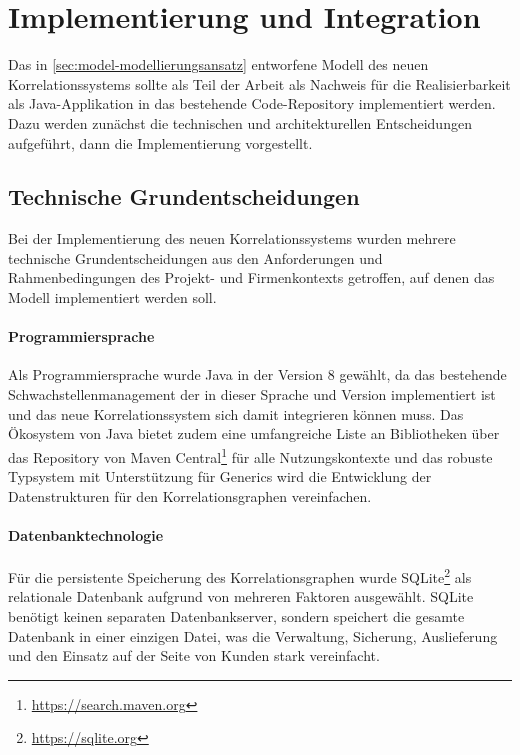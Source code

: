 \section{Implementierung und Integration}\label{sec:implementierung}

Das in \autoref{sec:model-modellierungsansatz} entworfene Modell des neuen Korrelationssystems sollte als Teil der Arbeit als Nachweis für die Realisierbarkeit als Java-Applikation in das bestehende Code-Repository implementiert werden.
Dazu werden zunächst die technischen und architekturellen Entscheidungen aufgeführt, dann die Implementierung vorgestellt.

\subsection{Technische Grundentscheidungen}\label{subsec:impl-tech-choices}

Bei der Implementierung des neuen Korrelationssystems wurden mehrere technische Grundentscheidungen aus den Anforderungen und Rahmenbedingungen des Projekt- und Firmenkontexts getroffen, auf denen das Modell implementiert werden soll.

\paragraph{Programmiersprache}

Als Programmiersprache wurde Java in der Version 8 gewählt, da das bestehende Schwachstellenmanagement der \metaeffektsp in dieser Sprache und Version implementiert ist und das neue Korrelationssystem sich damit integrieren können muss.
Das Ökosystem von Java bietet zudem eine umfangreiche Liste an Bibliotheken über das Repository von Maven Central\footnote{\url{https://search.maven.org}} für alle Nutzungskontexte und das robuste Typsystem mit Unterstützung für Generics wird die Entwicklung der Datenstrukturen für den Korrelationsgraphen vereinfachen.

\paragraph{Datenbanktechnologie}

Für die persistente Speicherung des Korrelationsgraphen wurde SQLite\footnote{\url{https://sqlite.org}} als relationale Datenbank aufgrund von mehreren Faktoren ausgewählt.
SQLite benötigt keinen separaten Datenbankserver, sondern speichert die gesamte Datenbank in einer einzigen Datei, was die Verwaltung, Sicherung, Auslieferung und den Einsatz auf der Seite von Kunden stark vereinfacht.

